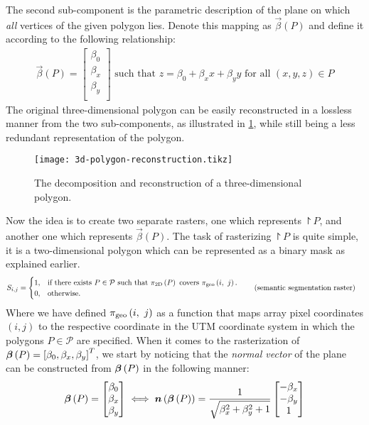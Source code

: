 The second sub-component is the parametric description of the plane on which \emph{all} vertices of the given polygon lies.
Denote this mapping as $\vec{\beta}(P)$ and define it according to the following relationship:
\begin{align*}
  \vec{\beta}(P)
  =
  \begin{bmatrix}
    \beta_0 \\
    \beta_x \\
    \beta_y \\
  \end{bmatrix}
  \text{ such that }
  z = \beta_0 + \beta_x x + \beta_y y \text{ for all } (x, y, z) \in P
\end{align*}
The original three-dimensional polygon can be easily reconstructed in a lossless manner from the two sub-components, as illustrated in \cref{fig:3d-polygon-reconstruction}, while still being a less redundant representation of the polygon.
%
\begin{figure}[H]
  \centering
  \texttt{[image: 3d-polygon-reconstruction.tikz]}
  \caption{%
    The decomposition and reconstruction of a three-dimensional polygon.
  }%
  \label{fig:3d-polygon-reconstruction}
\end{figure}
\noindent
Now the idea is to create two separate rasters, one which represents $\project{P}$, and another one which represents $\vec{\beta}(P)$.
The task of rasterizing $\project{P}$ is quite simple, it is a two-dimensional polygon which can be represented as a binary mask as explained earlier.
\begin{align*}
  S_{i,j} &= \begin{cases}
    1, &\text{if there exists } P \in \mathcal{P} \text{ such that } \pi_{\mathrm{2D}}\left(P\right) \text{ covers } \pi_{\mathrm{geo}}\left(i,~j\right).\\
    0, &\text{otherwise.}
  \end{cases}
  \tag{semantic segmentation raster}
\end{align*}
Where we have defined $\pi_{\mathrm{geo}}\left(i,~j\right)$ as a function that maps array pixel coordinates $(i, j)$ to the respective coordinate in the UTM coordinate system in which the polygons $P \in \mathcal{P}$ are specified.
When it comes to the rasterization of $\boldsymbol{\beta}\left(P\right) = {[\beta_0, \beta_x, \beta_y]}^T$, we start by noticing that the \textit{normal vector} of the plane can be constructed from $\boldsymbol{\beta}\left(P\right)$ in the following manner:
\begin{equation*}
  \boldsymbol{\beta}\left(P\right)
  =
  \begin{bmatrix}
    \beta_0\\
    \beta_x\\
    \beta_y\\
  \end{bmatrix}
  \iff
  \boldsymbol{n}\left(\boldsymbol{\beta}\left(P\right)\right)
  =
  \frac{1}{\sqrt{\beta_x^2 + \beta_y^2 + 1}}
  \begin{bmatrix}
    -\beta_x\\
    -\beta_y\\
    1
  \end{bmatrix}
\end{equation*}
